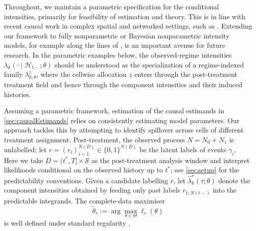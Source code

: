 \documentclass{statsoc}
\newcommand{\1}{\mathbbm{1}}
\newcommand{\Nproc}{N}
\newcommand{\Nzero}{N_0}
\newcommand{\None}{N_1}
\begin{document}
Throughout, we maintain a parametric specification for the conditional intensities, primarily for feasibility of estimation and theory. This is in line with recent causal work in complex spatial and networked settings, such as \citet{papadogeorgou2022causal}. Extending our framework to fully nonparametric or Bayesian nonparametric intensity models, for example along the lines of \citet{rousseau2025estimation}, is an important avenue for future research. %
In the parametric examples below, the observed-regime intensities \(\lambda_k(\cdot\mid \mathcal H_{t-};\theta)\) should be understood as the specialization of a regime-indexed family \(\lambda_{k,\theta}^z\), where the cellwise allocation \(z\) enters through the post-treatment treatment field and hence through the component intensities and their induced histories.

Assuming a parametric framework, estimation of the causal estimands in \cref{sec:causalEstimands} relies on consistently estimating model parameters. Our approach tackles this by attempting to identify spillover across cells of different treatment assignment. Post-treatment, the observed process \(\Nproc=\Nzero+\None\) is unlabelled; let \(r=(r_i)_{i=1}^{\Nproc(D)}\in\{0,1\}^{\Nproc(D)}\) be the latent labels of events \(\gamma_i\). Here we take \(D=(t^\ast,T]\times\mathcal S\) as the post-treatment analysis window and interpret likelihoods conditional on the observed history up to \(t^\ast\); see \cref{sec:setup} for the predictability conventions. Given a candidate labelling \(r\), let \(\widehat\lambda_k^r(\tau;\theta)\) denote the component intensities obtained by feeding only past labels \(r_{1:\Nproc(t-)}\) into the predictable integrands. The complete-data maximiser
\begin{equation}\label{eq:cdll-main}
\tilde\theta_r:=\arg\max_{\theta\in\Theta}\ell_r(\theta)
\end{equation}
is well defined under standard regularity \citep{ogata1978asymptotic,RATHBUN199655}.
\end{document}
